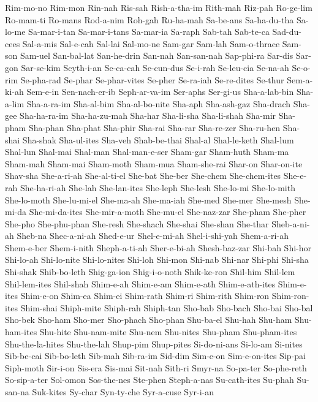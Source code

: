 {  Rim-mo-no Rim-mon Rin-nah Ris-sah Rish-a-tha-im Rith-mah
  Riz-pah Ro-ge-lim Ro-mam-ti Ro-mans Rod-a-nim Roh-gah
  Ru-ha-mah Sa-be-ans Sa-ha-du-tha Sa-lo-me Sa-mar-i-tan Sa-mar-i-tans
  Sa-mar-ia Sa-raph Sab-tah Sab-te-ca Sad-du-cees Sal-a-mis
  Sal-e-cah Sal-lai Sal-mo-ne Sam-gar Sam-lah Sam-o-thrace
  Sam-son Sam-uel San-bal-lat San-he-drin San-nah San-san-nah
  Sap-phi-ra Sar-dis Sar-gon Sar-se-kim Scyth-i-an Se-ca-cah
  Se-cun-dus Se-i-rah Se-leu-cia Se-na-ah Se-o-rim Se-pha-rad
  Se-phar Se-phar-vites Se-pher Se-ra-iah Se-re-dites Se-thur
  Sem-a-ki-ah Sem-e-in Sen-nach-er-ib Seph-ar-va-im Ser-aphs Ser-gi-us
  Sha-a-lab-bin Sha-a-lim Sha-a-ra-im Sha-al-bim Sha-al-bo-nite Sha-aph
  Sha-ash-gaz Sha-drach Sha-gee Sha-ha-ra-im Sha-ha-zu-mah Sha-har
  Sha-li-sha Sha-li-shah Sha-mir Sha-pham Sha-phan Sha-phat
  Sha-phir Sha-rai Sha-rar Sha-re-zer Sha-ru-hen Sha-shai
  Sha-shak Sha-ul-ites Sha-veh Shab-be-thai Shal-al Shal-le-keth
  Shal-lum Shal-lun Shal-mai Shal-man Shal-man-e-ser Sham-gar
  Sham-huth Sham-ma Sham-mah Sham-mai Sham-moth Sham-mua
  Sham-she-rai Shar-on Shar-on-ite Shav-sha She-a-ri-ah She-al-ti-el
  She-bat She-ber She-chem She-chem-ites She-e-rah She-ha-ri-ah
  She-lah She-lan-ites She-leph She-lesh She-lo-mi She-lo-mith
  She-lo-moth She-lu-mi-el She-ma-ah She-ma-iah She-med She-mer
  She-mesh She-mi-da She-mi-da-ites She-mir-a-moth She-mu-el She-naz-zar
  She-pham She-pher She-pho She-phu-phan She-resh She-shach
  She-shai She-shan She-thar Sheb-a-ni-ah Sheb-na Shec-a-ni-ah
  Shed-e-ur Shel-e-mi-ah Shel-i-shi-yah Shem-a-ri-ah Shem-e-ber Shem-i-nith
  Sheph-a-ti-ah Sher-e-bi-ah Shesh-baz-zar Shi-bah Shi-hor Shi-lo-ah
  Shi-lo-nite Shi-lo-nites Shi-loh Shi-mon Shi-nab Shi-nar
  Shi-phi Shi-sha Shi-shak Shib-bo-leth Shig-ga-ion Shig-i-o-noth
  Shik-ke-ron Shil-him Shil-lem Shil-lem-ites Shil-shah Shim-e-ah
  Shim-e-am Shim-e-ath Shim-e-ath-ites Shim-e-ites Shim-e-on Shim-ea
  Shim-ei Shim-rath Shim-ri Shim-rith Shim-ron Shim-ron-ites
  Shim-shai Shiph-mite Shiph-rah Shiph-tan Sho-bab Sho-bach
  Sho-bai Sho-bal Sho-bek Sho-ham Sho-mer Sho-phach
  Sho-phan Shu-ba-el Shu-hah Shu-ham Shu-ham-ites Shu-hite
  Shu-nam-mite Shu-nem Shu-nites Shu-pham Shu-pham-ites Shu-the-la-hites
  Shu-the-lah Shup-pim Shup-pites Si-do-ni-ans Si-lo-am Si-nites
  Sib-be-cai Sib-bo-leth Sib-mah Sib-ra-im Sid-dim Sim-e-on
  Sim-e-on-ites Sip-pai Siph-moth Sir-i-on Sis-era Sis-mai
  Sit-nah Sith-ri Smyr-na So-pa-ter So-phe-reth So-sip-a-ter
  Sol-omon Sos-the-nes Ste-phen Steph-a-nas Su-cath-ites Su-phah
  Su-san-na Suk-kites Sy-char Syn-ty-che Syr-a-cuse Syr-i-an
}
